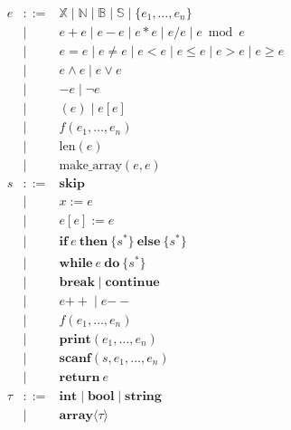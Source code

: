 \[
\begin{array}{rcl}
e &::=& \mathbb{X}
      \mid \mathbb{N}
      \mid \mathbb{B}
      \mid \mathbb{S}
      \mid \{e_1,\ldots,e_n\}
\\
  &\mid& e + e
      \mid e - e
      \mid e * e
      \mid e / e
      \mid e \bmod e
\\
  &\mid& e = e
      \mid e \neq e
      \mid e < e
      \mid e \le e
      \mid e > e
      \mid e \ge e
\\
  &\mid& e \land e
      \mid e \lor e
\\
  &\mid& -e
      \mid \neg e
\\
  &\mid& (e)
      \mid e[e]
\\
  &\mid& f(e_1,\ldots,e_n)
\\
  &\mid& \mathrm{len}(e)
\\
  &\mid& \mathrm{make\_array}(e,e)
\\[1em]

s &::=& \mathbf{skip}
\\
  &\mid& x := e
\\
  &\mid& e[e] := e
\\
  &\mid& \mathbf{if}\ e\ \mathbf{then}\ \{s^*\}
      \ \mathbf{else}\ \{s^*\}
\\
  &\mid& \mathbf{while}\ e\ \mathbf{do}\ \{s^*\}
\\
  &\mid& \mathbf{break}
      \mid \mathbf{continue}
\\
  &\mid& e{++}
      \mid e{--}
\\
  &\mid& f(e_1,\ldots,e_n)
\\
  &\mid& \mathbf{print}(e_1,\ldots,e_n)
\\
  &\mid& \mathbf{scanf}(s,e_1,\ldots,e_n)
\\
  &\mid& \mathbf{return}\ e
\\[1em]

\tau &::=& \mathbf{int}
        \mid \mathbf{bool}
        \mid \mathbf{string}
\\
     &\mid& \mathbf{array}\langle\tau\rangle
\end{array}
\]